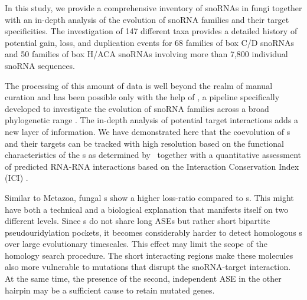 
In this study, we provide a comprehensive inventory of snoRNAs in fungi together with
an in-depth analysis of the evolution of snoRNA families and their target
specificities. The investigation of 147 different taxa provides a detailed
history of potential gain, loss, and duplication events for 68 families of box C/D
snoRNAs and 50 families of box H/ACA snoRNAs involving more than 7,800
individual snoRNA sequences. 


The processing of this amount of data is well beyond the realm of manual
curation and has been possible only with the help of \snostrip, a pipeline
specifically developed to investigate the evolution of snoRNA families
across a broad phylogenetic range \cite{Bartschat:2014}.  The in-depth
analysis of potential target interactions adds a new layer of
information. We have demonstrated here that the coevolution of \sno s and
their targets can be tracked with high resolution based on the functional
characteristics of the \sno s as determined by \snostrip\ together with a
quantitative assessment of predicted RNA-RNA interactions based on the 
Interaction Conservation Index (ICI) \cite{Kehr:2014}.

Similar to Metazoa, fungal \haca s show a higher loss-ratio compared
to \cd s. This might have both a technical and a biological
explanation that manifests itself on two different levels. Since \haca
s do not share long ASEs but rather short bipartite pseudouridylation
pockets, it becomes considerably harder to detect homologous \sno s
over large evolutionary timescales. This effect may limit the scope of
the homology search procedure. The short interacting regions make
these molecules also more vulnerable to mutations that disrupt the
snoRNA-target interaction. At the same time, the presence of the
second, independent ASE in the other hairpin may be a sufficient cause
to retain mutated genes.

